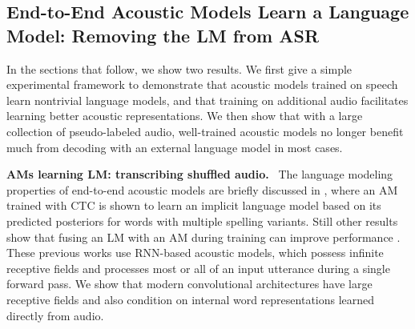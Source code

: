 \documentclass{article}
\begin{document}
\subsection{End-to-End Acoustic Models Learn a Language Model: Removing the LM from ASR}

In the sections that follow, we show two results. We first give a simple experimental framework to demonstrate that acoustic models trained on speech learn nontrivial language models, and that training on additional audio facilitates learning better acoustic representations. We then show that with a large collection of pseudo-labeled audio, well-trained acoustic models no longer benefit much from decoding with an external language model in most cases.

\textbf{AMs learning LM: transcribing shuffled audio.}~
\label{sec:amlearninglm}
The language modeling properties of end-to-end acoustic models are briefly discussed in \cite{chan2016las}, where an AM trained with CTC is shown to learn an implicit language model based on its predicted posteriors for words with multiple spelling variants. Still other results show that fusing an LM with an AM during training can improve performance \cite{sriram2017cold, chorowski2016towards, wu2016google}. These previous works use RNN-based acoustic models, which possess infinite receptive fields and processes most or all of an input utterance during a single forward pass. We show that modern convolutional architectures have large receptive fields and also condition on internal word representations learned directly from audio.
\end{document}
